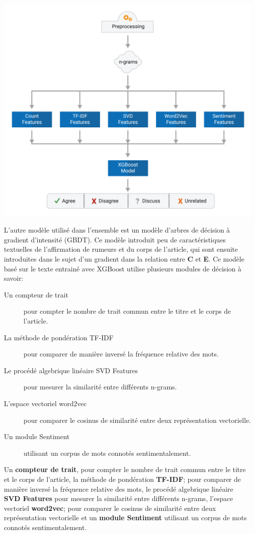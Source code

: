 \documentclass[onecolumn, 12pt]{article}
\begin{document}
\begin{center}
 \includegraphics[scale=0.5]{../../img/model/solat_in_the_swen/tree_model_light.png}
 \label{fig2}
\end{center}

L'autre modèle utilisé dans l'ensemble est un modèle d'arbres de décision à gradient d'intensité (GBDT).
Ce modèle introduit peu de caractéristiques textuelles de l'affirmation de rumeurs et du corps de l'article, qui sont ensuite introduites dans le sujet d'un gradient dans la relation entre \textbf{C} et \textbf{E}. Ce modèle basé sur le texte entrainé avec XGBoost utilise plusieurs modules de décision à savoir:
\begin{description}
 \item [Un compteur de trait] pour compter le nombre de trait commun entre le titre et le corps de l'article.
 \item [La méthode de pondération TF-IDF] pour comparer de manière inversé la fréquence relative des mots.
 \item [Le procédé algebrique linéaire SVD Features] pour mesurer la similarité entre différents n-grams.
 \item [L'espace vectoriel word2vec] pour comparer le cosinus de similarité entre deux représentation vectorielle.
 \item [Un module Sentiment] utilisant un corpus de mots connotés sentimentalement.
 
\end{description}
Un \textbf{compteur de trait}, pour compter le nombre de trait commun entre le titre et le corps de l'article, la méthode de pondération \textbf{TF-IDF}; pour comparer de manière inversé la fréquence relative des mots, le procédé algebrique linéaire \textbf{SVD Features} pour mesurer la similarité entre différents n-grams, l'espace vectoriel \textbf{word2vec}; pour comparer le cosinus de similarité entre deux représentation vectorielle et un \textbf{module Sentiment} utilisant un corpus de mots connotés sentimentalement.
\end{document}

